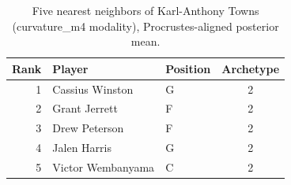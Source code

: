 \begin{table}[htbp]
  \centering\small
  \begin{tabular}{rllc}
    \toprule
    Rank & Player & Position & Archetype \\
    \midrule
    1 & Cassius Winston & G & 2 \\
    2 & Grant Jerrett & F & 2 \\
    3 & Drew Peterson & F & 2 \\
    4 & Jalen Harris & G & 2 \\
    5 & Victor Wembanyama & C & 2 \\
    \bottomrule
  \end{tabular}
  \caption{Five nearest neighbors of Karl-Anthony Towns (curvature_m4 modality), Procrustes-aligned posterior mean.}
  \label{tab:Karl_Anthony_Towns_neighbors_curvature_m4}
\end{table}

